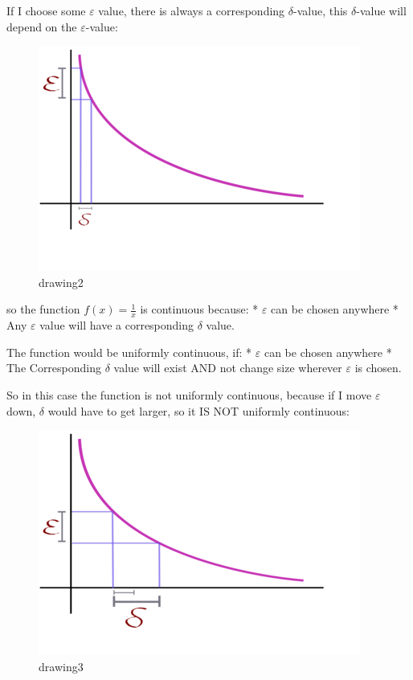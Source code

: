 \documentclass[class=article, crop=false]{standalone}
\begin{document}
If I choose some \(\varepsilon\) value, there is always a corresponding
\(\delta\)-value, this \(\delta\)-value will depend on the
\(\varepsilon\)-value:

\begin{figure}
\centering
\includegraphics{./media/ComplexSeries/drawing2.png}
\caption{drawing2}
\end{figure}

so the function \(f\left( x \right) = \frac{1}{x}\) is continuous
because: * \(\varepsilon\) can be chosen anywhere * Any \(\varepsilon\)
value will have a corresponding \(\delta\) value.

The function would be uniformly continuous, if: * \(\varepsilon\) can be
chosen anywhere * The Corresponding \(\delta\) value will exist AND not
change size wherever \(\varepsilon\) is chosen.

So in this case the function is not uniformly continuous, because if I
move \(\varepsilon\) down, \(\delta\) would have to get larger, so it IS
NOT uniformly continuous:

\begin{figure}
\centering
\includegraphics{./media/ComplexSeries/drawing3.png}
\caption{drawing3}
\end{figure}
\end{document}

